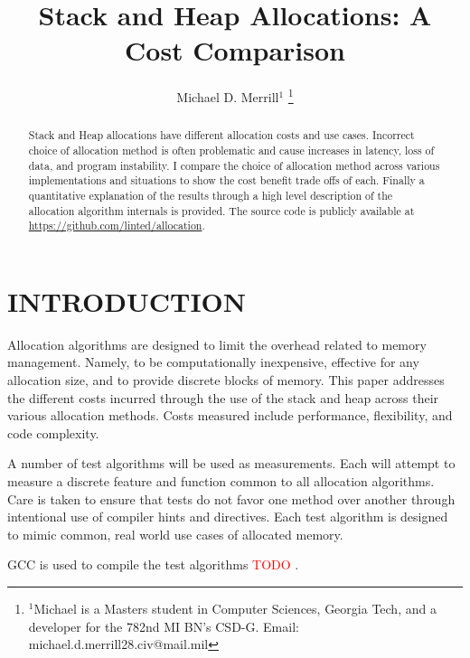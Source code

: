 \documentclass[letterpaper, 10 pt, conference]{ieeeconf}  %
\title{\LARGE \bf
Stack and Heap Allocations: A Cost Comparison
}
\author{Michael D. Merrill$^{1}$%
\thanks{$^{1}$Michael is a Masters student in Computer Sciences, Georgia Tech,
and a developer for the 782nd MI BN's CSD-G.
Email: michael.d.merrill28.civ@mail.mil}%
}
\newcommand*\GitHubLoc{https://github.com/linted/allocation}
\newcommand*\todo[0]{\textcolor{red}{TODO }}
\begin{document}
\maketitle
\thispagestyle{empty}
\pagestyle{empty}


\begin{abstract}
Stack and Heap allocations have different allocation costs and use cases.
Incorrect choice of allocation method is often problematic and cause increases in latency,
loss of data, and program instability. I compare the choice of allocation method across various 
implementations and situations to show the cost benefit trade offs of each. 
Finally a quantitative explanation of the results through a high level description of the allocation algorithm internals is provided.
The source code is publicly available at \url{\GitHubLoc}.

\end{abstract}

\section{INTRODUCTION}

Allocation algorithms are designed to limit the overhead related to memory management.
Namely, to be computationally inexpensive, effective for any allocation size, and to provide discrete blocks of memory. This paper addresses the different costs incurred through the use of the stack and heap across their various allocation methods. Costs measured include performance, flexibility, and code complexity.

A number of test algorithms will be used as measurements. Each will attempt to measure a discrete feature and function common to all allocation algorithms. Care is taken to ensure that tests do not favor one method over another through intentional use of compiler hints and directives. Each test algorithm is designed to mimic common, real world use cases of allocated memory. 

GCC is used to compile the test algorithms \todo.

\end{document}
